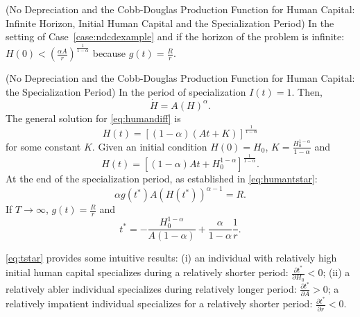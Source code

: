 \begin{case} (No Depreciation and the Cobb-Douglas Production Function for Human Capital: Infinite Horizon, Initial Human Capital and the Specialization Period)
In the setting of Case~\ref{case:ndcdexample} and if the horizon of the problem is infinite: $H(0) < \left( \frac{\alpha A}{r} \right) ^{\frac{1}{1 - \alpha}}$ because $g(t) = \frac{R}{r}$.
\end{case}

\begin{case} (No Depreciation and the Cobb-Douglas Production Function for Human Capital: the Specialization Period)
In the period of specialization $I(t) = 1$. Then,
\begin{equation}
\dot{H} = A \left( H \right)^{\alpha} \label{eq:humandiff}.
\end{equation}
The general solution for \eqref{eq:humandiff} is
\begin{equation}
H(t) = \left[ (1 - \alpha)(At + K) \right]^{\frac{1}{1-\alpha}}
\end{equation}
for some constant $K$. Given an initial condition $H(0) = H_{0}$, $K = \frac{H_{0}^{1-\alpha}}{1-\alpha}$ and
\begin{equation}
H(t) = \left[ (1 - \alpha)At + H_{0}^{1-\alpha} \right]^{\frac{1}{1-\alpha}} \label{eq:hbeforetstar}.
\end{equation}
At the end of the specialization period, as established in \eqref{eq:humantstar}:
\begin{equation}
\alpha g(t^*) A \left( H(t^*) \right)^{\alpha - 1} = R.
\end{equation}
If $T \rightarrow \infty$, $g(t) = \frac{R}{r}$ and
\begin{equation}
t^* = - \frac{H_{0}^{1 - \alpha}}{A(1 - \alpha)} + \frac{\alpha}{1 - \alpha}\frac{1}{r}. \label{eq:tstar}
\end{equation}

\indent \eqref{eq:tstar} provides some intuitive results: (i) an individual with relatively high initial human capital specializes during a relatively shorter period: $\frac{\partial t^*}{\partial       H_{0}} < 0$; (ii) a relatively abler individual specializes during relatively longer period: $\frac{\partial t^*}{\partial A} > 0$; a relatively impatient individual specializes for a relatively shorter period: $\frac{\partial t^*}{\partial r} < 0$.
\end{case}

